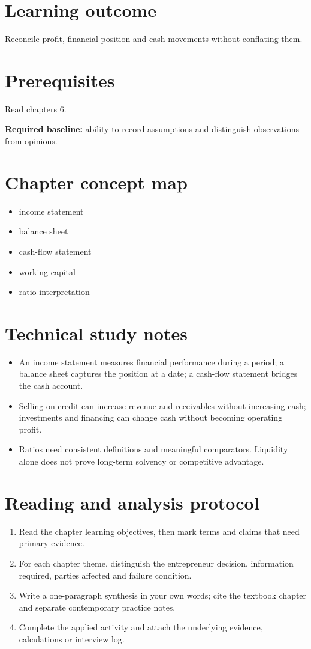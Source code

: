 \documentclass[11pt,letterpaper]{article}
\begin{document}
\SuiteOpen
\section{Learning outcome}
Reconcile profit, financial position and cash movements without conflating them.
\section{Prerequisites}
Read chapters 6.\par\textbf{Required baseline:} ability to record assumptions and distinguish observations from opinions.
\section{Chapter concept map}
\begin{itemize}[leftmargin=*,itemsep=3pt]
\item income statement
\item balance sheet
\item cash-flow statement
\item working capital
\item ratio interpretation
\end{itemize}

\section{Technical study notes}
\begin{itemize}[leftmargin=*,itemsep=3pt]
\item An income statement measures financial performance during a period; a balance sheet captures the position at a date; a cash-flow statement bridges the cash account.
\item Selling on credit can increase revenue and receivables without increasing cash; investments and financing can change cash without becoming operating profit.
\item Ratios need consistent definitions and meaningful comparators. Liquidity alone does not prove long-term solvency or competitive advantage.
\end{itemize}

\section{Reading and analysis protocol}
\begin{enumerate}[leftmargin=*,itemsep=5pt]
\item Read the chapter learning objectives, then mark terms and claims that need primary evidence.
\item For each chapter theme, distinguish the entrepreneur decision, information required, parties affected and failure condition.
\item Write a one-paragraph synthesis in your own words; cite the textbook chapter and separate contemporary practice notes.
\item Complete the applied activity and attach the underlying evidence, calculations or interview log.
\end{enumerate}
\end{document}
